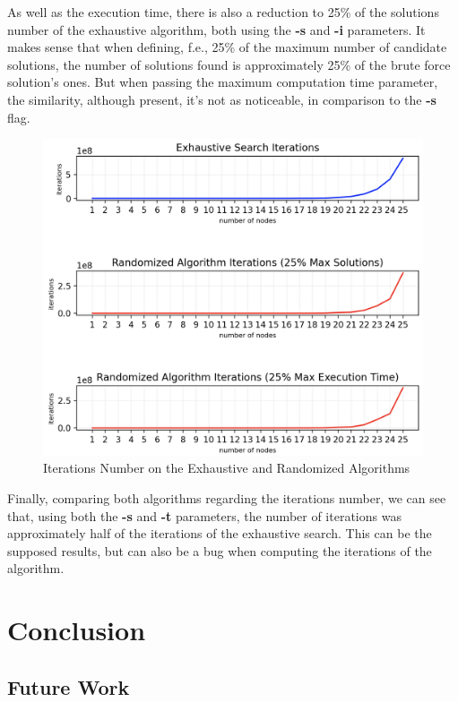 \documentclass[...]{revdetua}
\begin{document}
As well as the execution time, there is also a reduction to 25\% of the solutions number of the exhaustive algorithm, both using the \textbf{-s} and \textbf{-i} parameters. It makes sense that when defining, f.e., 25\% of the maximum number of candidate solutions, the number of solutions found is approximately 25\% of the brute force solution's ones. But when passing the maximum computation time parameter, the similarity, although present, it's not as noticeable, in comparison to the \textbf{-s} flag.

\begin{figure}[H]
    \centering
    \includegraphics[width=0.9\columnwidth]{./figures/iterations_0.25.png}
    \caption{Iterations Number on the Exhaustive and Randomized Algorithms}
    \label{fig: Iterations on the Exhaustive and Randomized Algorithms}
\end{figure}

Finally, comparing both algorithms regarding the iterations number, we can see that, using both the \textbf{-s} and \textbf{-t} parameters, the number of iterations was approximately half of the iterations of the exhaustive search. This can be the supposed results, but can also be a bug when computing the iterations of the algorithm.



\section{Conclusion}



\subsection{Future Work}
\end{document}
